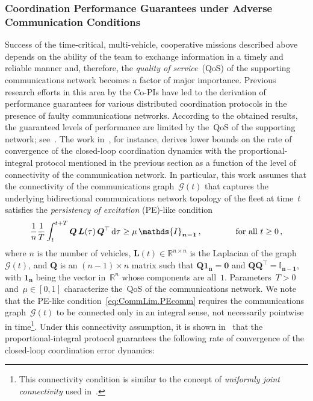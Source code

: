 \documentclass[letter,onecolumn,12pt]{aiaa-tc}
\newcommand{\IR}{\mathds{R}}
\newcommand{\IIn}[1]{\mathds{I}_{\bm{#1}}}
\newcommand{\1}{1_n}
\newcommand{\Gcal}{\mathcal{G}}
\begin{document}
\subsubsection{Coordination Performance Guarantees under Adverse Communication Conditions}

Success of the time-critical, multi-vehicle, cooperative missions described above depends on the ability of the team to exchange information in a timely and reliable manner and, therefore, the \emph{quality of service}~(QoS) of the supporting communications network becomes a factor of major importance. Previous research efforts in this area by the Co-PIs have led to the derivation of performance guarantees for various distributed coordination protocols in the presence of faulty communications networks. According to the obtained results, the guaranteed levels of performance are limited by the~QoS of the supporting network; see~\cite{CSM12_CPF,CDC12_QuadCPF,JGCD13_CPF,XargayPhd}. The work in~\cite{XargayPhd}, for instance, derives lower bounds on the rate of convergence of the closed-loop coordination dynamics with the proportional-integral protocol mentioned in the previous section as a function of the level of connectivity of the communication network. In particular, this work assumes that the connectivity of the communications graph~$\Gcal(t)$ that captures the underlying bidirectional communications network topology of the fleet at time~$t$ satisfies the \emph{persistency of excitation} (PE)-like condition~\cite{PassivityCoord_Arcak}
\begin{equation}\label{eq:CommLim.PEcomm}
\frac{1}{n}\frac{1}{T} \int_t^{t+T} \bm{Q}\,\bm{L}(\tau)\,\bm{Q}^{\top}\,{\rm d}\tau \geq \mu \,\IIn{n-1}\,,
\qquad\qquad \mbox{for all}~t\geq0\,,
\end{equation}
where $n$ is the number of vehicles, ${\bm{L}(t)\in\IR^{n\times n}}$ is the Laplacian of the graph~$\Gcal(t)$, and $\bm{Q}$ is an ${(n-1)\times n}$ matrix such that ${\bm{Q}\bm{1_n}=\bm{0}}$ and ${\bm{Q}\bm{Q}^{\top}=\IIn{n-1}}$, with $\bm{1_n}$ being the vector in~$\IR^n$ whose components are all~$1$. Parameters~${T>0}$ and~${\mu\in[0,1]}$ characterize the~QoS of the communications network. We note that the PE-like condition~\eqref{eq:CommLim.PEcomm} requires the communications graph~$\Gcal(t)$ to be connected only in an integral sense, not necessarily pointwise in time\footnote{This connectivity condition is similar to the concept of \emph{uniformly joint connectivity} used in~\cite{lin07}.}. Under this connectivity assumption, it is shown in~\cite{XargayPhd} that the proportional-integral protocol guarantees the following rate of convergence of the closed-loop coordination error dynamics:
\end{document}
